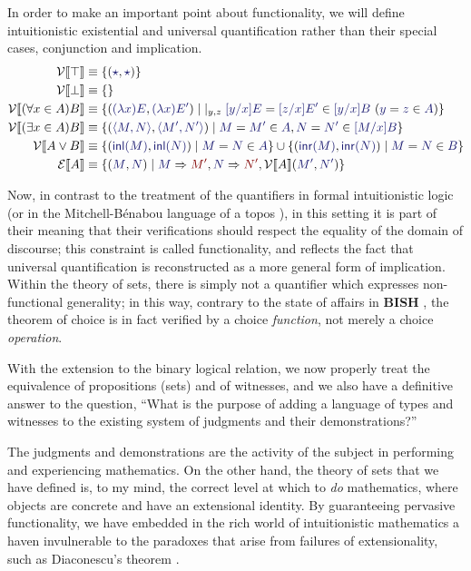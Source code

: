 \documentclass[11pt]{amsart}
\theoremstyle{definition}
\theoremstyle{remark}
\numberwithin{equation}{section}
\def\InputModeColorName{MidnightBlue}
\def\OutputModeColorName{Maroon}
\newcommand\InputMode[1]{{\color{\InputModeColorName}{#1}}}
\newcommand\OutputMode[1]{{\color{\OutputModeColorName}{#1}}}
\newcommand\HypJ[2]{#1\ (#2)}
\newcommand\GenJ[2]{\vert_{#1}\; #2}
\newcommand\EqMember[3]{\InputMode{#1}=\InputMode{#2}\in \InputMode{#3}}
\newcommand\Eval[2]{\InputMode{#1}\Rightarrow \OutputMode{#2}}
\newcommand\SEM[1]{\llbracket#1 \rrbracket}
\newcommand\VAL[1]{\mathcal{V}\SEM{#1}}
\newcommand\EXP[1]{\mathcal{E}\SEM{#1}}
\newcommand\True{\top}
\newcommand\False{\bot}
\newcommand\Disj[2]{#1\lor #2}
\newcommand\Forall[3]{(\forall #2 \in #1)#3}
\newcommand\Exists[3]{(\exists #2 \in #1)#3}
\newcommand\It{\star}
\newcommand\Lam[2]{(\lambda #1) #2}
\newcommand\Pair[2]{\langle #1, #2 \rangle}
\newcommand\Inl[1]{\mathsf{inl}(#1)}
\newcommand\Inr[1]{\mathsf{inr}(#1)}
\newcommand\BISH{\textbf{BISH}}
\begin{document}
In order to make an important point about functionality, we will define
intuitionistic existential and universal quantification rather than their
special cases, conjunction and implication.
%
\begin{align*}
  \VAL{\True} &\equiv \{(\InputMode{\It}, \InputMode{\It})\}\\
  \VAL{\False} &\equiv \{\}\\
  \VAL{\Forall{A}{x}{B}} &\equiv
    \{ (\InputMode{\Lam{x}{E}}, \InputMode{\Lam{x}{E'}})
    \mid \GenJ{y,z}{
      \HypJ{\EqMember{[y/x]E}{[z/x]E'}{[y/x]B}}{\EqMember{y}{z}{A}}
    }
    \}\\
  \VAL{\Exists{A}{x}{B}} &\equiv
    \{ (\InputMode{\Pair{M}{N}}, \InputMode{\Pair{M'}{N'}})
    \mid \EqMember{M}{M'}{A}, \EqMember{N}{N'}{[M/x]B}
    \}\\
  \VAL{\Disj{A}{B}} &\equiv
    \{ (\InputMode{\Inl{M}}, \InputMode{\Inl{N}})
    \mid \EqMember{M}{N}{A}
    \} \cup
    \{ (\InputMode{\Inr{M}}, \InputMode{\Inr{N}})
    \mid \EqMember{M}{N}{B}
    \}\\
  \EXP{A} &\equiv
    \{ (\InputMode{M}, \InputMode{N})
    \mid \Eval{M}{M'}, \Eval{N}{N'}, \VAL{A}(\InputMode{M'}, \InputMode{N'})
    \}
\end{align*}

Now, in contrast to the treatment of the quantifiers in formal intuitionistic
logic (or in the Mitchell-B\'enabou language of a topos
\cite{maclane-moerdijk}), in this setting it is part of their meaning that their
verifications should respect the equality of the domain of discourse; this
constraint is called functionality, and reflects the fact that universal
quantification is reconstructed as a more general form of implication. Within
the theory of sets, there is simply not a quantifier which expresses
non-functional generality; in this way, contrary to the state of affairs in
\BISH{} \cite{bishop:1967}, the theorem of choice is in fact verified by a
choice \emph{function}, not merely a choice \emph{operation}.

With the extension to the binary logical relation, we now properly treat the
equivalence of propositions (sets) and of witnesses, and we also have a
definitive answer to the question, ``What is the purpose of adding a language of
types and witnesses to the existing system of judgments and their
demonstrations?''

The judgments and demonstrations are the activity of the subject in performing
and experiencing mathematics. On the other hand, the theory of sets that we have
defined is, to my mind, the correct level at which to \emph{do} mathematics,
where objects are concrete and have an extensional identity. By guaranteeing
pervasive functionality, we have embedded in the rich world of intuitionistic
mathematics a haven invulnerable to the paradoxes that arise from failures of
extensionality, such as Diaconescu's theorem \cite{martin-lof:2009, sterling:diaconescu}.
\end{document}
